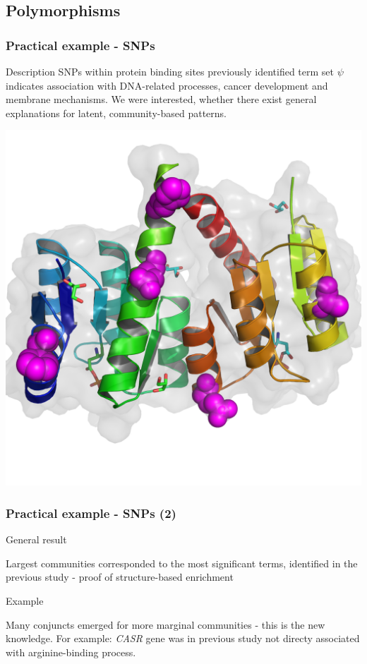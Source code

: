 \documentclass{beamer}
\begin{document}
  \subsection{Polymorphisms}
  \begin{frame}\frametitle{Practical example - SNPs}

    \begin{block}{Description}
      SNPs within protein binding sites previously identified term set $\psi$ indicates association with DNA-related processes, cancer development and membrane mechanisms. We were interested, whether there exist general explanations for latent, community-based patterns.
    \end{block}

    \begin{center}
      \includegraphics[scale=0.35]{images/snps}
      \end{center}
  \end{frame}


  \begin{frame}\frametitle{Practical example - SNPs (2)}

    \begin{block}{General result}

      Largest communities corresponded to the most significant terms, identified in the previous study - proof of structure-based enrichment
      
    \end{block}

        \begin{exampleblock}{Example}

          Many conjuncts emerged for more marginal communities - this is the new knowledge.
          For example: \textit{CASR} gene was in previous study not directy associated with arginine-binding process.
      
        \end{exampleblock}        
       
      \end{frame}
\end{document}
